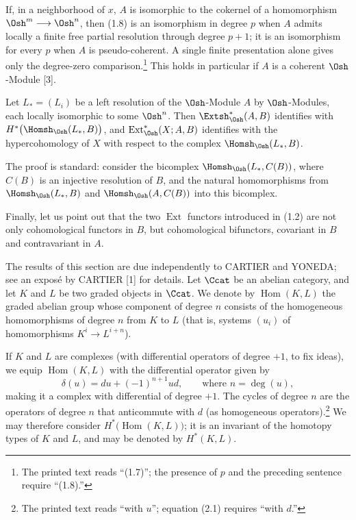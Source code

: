  If, in a neighborhood of $x$, $A$ is isomorphic to the
cokernel of a homomorphism $\Osh^{m}\longrightarrow\Osh^{n}$, then (1.8) is an isomorphism in degree $p$ when $A$ admits locally a finite free partial resolution through degree $p+1$; it is an isomorphism for every $p$ when $A$ is pseudo-coherent. A single finite presentation alone gives only the degree-zero comparison.\footnote{The printed text reads “(1.7)”; the presence
of $p$ and the preceding sentence require “(1.8).”} This holds in particular if
$A$ is a coherent $\Osh$-Module [3].

 Let $L_{*}=(L_i)$ be a left resolution of the
$\Osh$-Module $A$ by $\Osh$-Modules, each locally isomorphic to some $\Osh^{n}$.
Then $\Extsh_{\Osh}^{*}(A,B)$ identifies with
$H^{*}\bigl(\Homsh_{\Osh}(L_{*},B)\bigr)$, and
$\operatorname{Ext}_{\Osh}^{*}(X;A,B)$ identifies with the hypercohomology of
$X$ with respect to the complex $\Homsh_{\Osh}(L_{*},B)$.

The proof is standard: consider the bicomplex $\Homsh_{\Osh}(L_{*},C(B))$,
where $C(B)$ is an injective resolution of $B$, and the natural homomorphisms
from $\Homsh_{\Osh}(L_{*},B)$ and $\Homsh_{\Osh}(A,C(B))$ into this bicomplex.

Finally, let us point out that the two $\operatorname{Ext}$ functors introduced
in (1.2) are not only cohomological functors in $B$, but cohomological
bifunctors, covariant in $B$ and contravariant in $A$.


The results of this section are due independently to CARTIER and YONEDA; see an
exposé by CARTIER [1] for details. Let $\Ccat$ be an abelian category, and let
$K$ and $L$ be two graded objects in $\Ccat$. We denote by
$\operatorname{Hom}(K,L)$ the graded abelian group whose component of degree
$n$ consists of the homogeneous homomorphisms of degree $n$ from $K$ to $L$
(that is, systems $(u_i)$ of homomorphisms
$K^{i}\longrightarrow L^{i+n}$).

If $K$ and $L$ are complexes (with differential operators of degree $+1$, to
fix ideas), we equip $\operatorname{Hom}(K,L)$ with the differential operator
given by
\begin{equation}\tag{2.1}
  \delta(u)=du+(-1)^{n+1}ud,\qquad\text{where }n=\deg(u),
\end{equation}
making it a complex with differential of degree $+1$. The cycles of degree $n$
are the operators of degree $n$ that anticommute with $d$ (as homogeneous
operators).\footnote{The printed text reads “with $u$”; equation (2.1) requires
“with $d$.”} We may therefore consider
$H^{*}\bigl(\operatorname{Hom}(K,L)\bigr)$; it is an invariant of the homotopy
types of $K$ and $L$, and may be denoted by $H^{*}(K,L)$.

